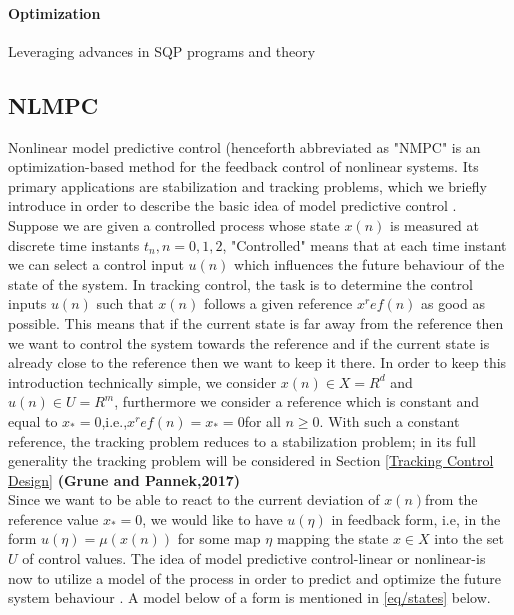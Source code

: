 \documentclass{UoNMCHA}
\numberwithin{equation}{section}
\begin{document}
	\paragraph*{Optimization}
	
	Leveraging advances in SQP programs and theory 
	
	\subsection{NLMPC}
	
	Nonlinear model predictive control (henceforth abbreviated as "NMPC"  is an optimization-based method for the feedback control of nonlinear systems. Its primary applications are stabilization and tracking problems, which we briefly introduce in order to describe the basic idea of model predictive control \cite{larsgrune_2017_nonlinear}. \\
	
	Suppose we are given a controlled process whose state $x(n)$ is measured at discrete time instants $t_n,n=0,1,2$, "Controlled" means that at each time instant we can select a control input $u(n)$ which 
	influences the future behaviour of the state of the system. In tracking control, the task is to determine the control inputs $u(n)$ such that $x(n)$ follows a given reference $x^ref  (n)$ as good as possible. This means that if the current state is far away from the reference then we want to control the system towards the reference and if the current state is already close to the reference then we want to keep it there. In order to keep this introduction technically simple, we consider $x(n)\in X=R^d$ and $u(n)\in U=R^m$, furthermore we consider a reference which is constant and equal to $x_{*}=0$,i.e.,$x^ref (n)=x_{*}=0 $for all $n\geq 0$. With such a constant reference, the tracking problem reduces to a stabilization problem; in its full generality the tracking problem will be considered in Section \ref{Tracking Control Design} \textbf{(Grune and Pannek,2017)} \\
	
	Since we want to be able to react to the current deviation of $x(n)$from the reference value $x_{*}=0$, we would like to have $u(\eta)$ in feedback form, i.e, in the form $u(\eta)=\mu(x(n))$ for some map $\eta$ mapping the state $x \in X$ into the set $U$ of control values. The idea of model predictive control-linear or nonlinear-is now to utilize a model of the process in order to predict and optimize the future system behaviour \cite{larsgrune_2017_nonlinear}. A model below of a  form is mentioned in \ref{eq/states} below.
	
\end{document}
